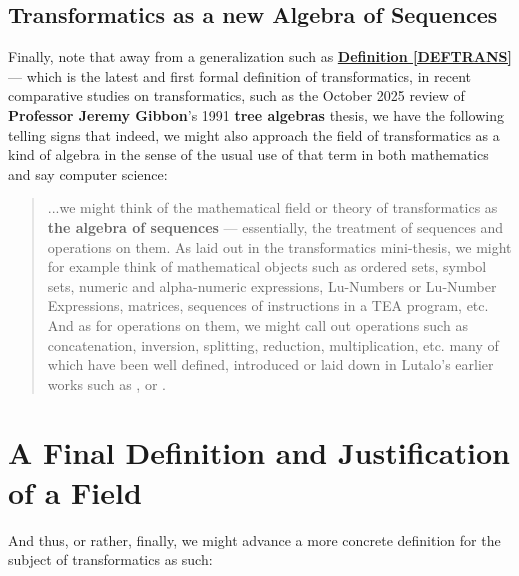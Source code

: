 \documentclass[a4paper, 18pt]{book} %
\begin{document}
\begin{appendices}
\subsection{Transformatics as a new Algebra of Sequences}
\label{SECTRANSLAG}

Finally, note that away from a generalization such as \textbf{\hyperref[DEFTRANS]{Definition \ref{DEFTRANS}}} --- which is the latest and first formal definition of transformatics, in recent comparative studies on transformatics, such as the October 2025 review of \textbf{Professor Jeremy Gibbon}'s 1991 \textbf{tree algebras} thesis\cite{treealgebras_review}, we have the following telling signs that indeed, we might also approach the field of transformatics as a kind of algebra in the sense of the usual use of that term in both mathematics and say computer science:


\noindent
\begin{minipage}{1\textwidth}
\vspace{1em}
\begin{quotation}
{\ttfamily

...we might think of the mathematical field or theory of transformatics\cite{Lutalo2025_transformatics_thesis} as \textbf{the algebra of sequences} --- essentially, the treatment of sequences and operations on them. As laid out in the transformatics mini-thesis\cite{Lutalo2025_transformatics_thesis}, we might for example think of mathematical objects such as ordered sets, symbol sets, numeric and alpha-numeric expressions, Lu-Numbers or Lu-Number Expressions\cite{lnspaper}, matrices, sequences of instructions in a TEA program, etc. And as for operations on them, we might call out operations such as concatenation, inversion, splitting, reduction, multiplication, etc. many of which have been well defined, introduced or laid down in Lutalo's earlier works such as \cite{lutalo_2025_trans_genetics}, \cite{lnspaper} or \cite{transformatics}.

}
\end{quotation}
\vspace{1em}
\end{minipage}


\section{A Final Definition and Justification of a Field}


And thus, or rather, finally, we might advance a more concrete definition for the subject of transformatics as such:



\end{appendices}
\end{document}
